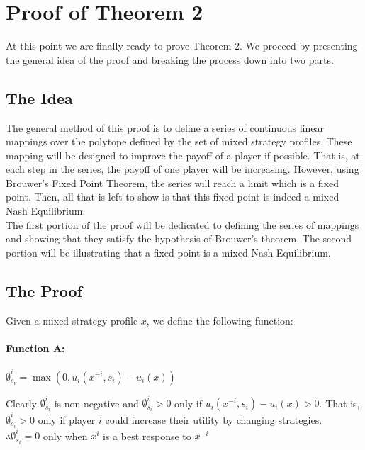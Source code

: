\documentclass[12pt]{article}
\begin{document}
\section{Proof of Theorem 2}

At this point we are finally ready to prove Theorem 2. We proceed by presenting the general idea of the proof and breaking the process down into two parts.\\

\subsection{The Idea}

The general method of this proof is to define a series of continuous linear mappings over the polytope defined by the set of mixed strategy profiles. These mapping will be designed to improve the payoff of a player if possible. That is, at each step in the series, the payoff of one player will be increasing. However, using Brouwer’s Fixed Point Theorem, the series will reach a limit which is a fixed point. Then, all that is left to show is that this fixed point is indeed a mixed Nash Equilibrium.\\

The first portion of the proof will be dedicated to defining the series of mappings and showing that they satisfy the hypothesis of Brouwer’s theorem. The second portion will be illustrating that a fixed point is a mixed Nash Equilibrium.

\subsection{The Proof}

Given a mixed strategy profile $x$, we define the following function:

\paragraph{Function A:} $\emptyset^i_{s_i} = \max(0,u_i(x^{-i},s_i) - u_i(x))$

Clearly $\emptyset^i_{s_i}$ is non-negative and $\emptyset^i_{s_i} > 0$ only if $u_i(x^{-i},s_i) - u_i(x) > 0$. That is, $\emptyset^i_{s_i} > 0$ only if player $i$ could increase their utility by changing strategies.\\

$\therefore \emptyset^i_{s_i} = 0$ only when $x^i$ is a best response to $x^{-i}$
\end{document}
